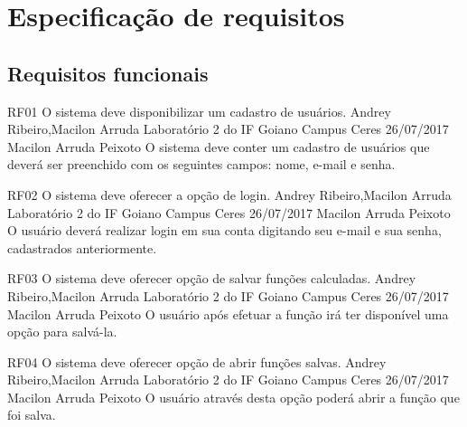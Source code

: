 

\chapter{Especificação de requisitos}
 	
\section{Requisitos funcionais}
 	
 \requisitoFuncional
 {RF01}
 {O sistema deve disponibilizar um cadastro de usuários.}
 {Andrey Ribeiro,Macilon Arruda}
 {Laboratório 2 do IF Goiano Campus Ceres}
 {26/07/2017}
 {Macilon Arruda Peixoto}
 {O sistema deve conter um cadastro de usuários que deverá ser preenchido com os seguintes campos: nome, e-mail e senha.
 }
 
 \requisitoFuncional
 {RF02}
 {O sistema deve oferecer a opção de login.}
 {Andrey Ribeiro,Macilon Arruda}
 {Laboratório 2 do IF Goiano Campus Ceres}
 {26/07/2017}
 {Macilon Arruda Peixoto}
 {O usuário deverá realizar login em sua conta digitando seu e-mail e sua senha, cadastrados anteriormente.
 } 
 
 \requisitoFuncional
 {RF03}
 {O sistema deve oferecer opção de salvar funções calculadas.}
 {Andrey Ribeiro,Macilon Arruda}
 {Laboratório 2 do IF Goiano Campus Ceres}
 {26/07/2017}
 {Macilon Arruda Peixoto}
 {O usuário após efetuar a função irá ter disponível uma opção para salvá-la.
 }
 
 \requisitoFuncional
 {RF04}
 {O sistema deve oferecer opção de abrir funções salvas.}
 {Andrey Ribeiro,Macilon Arruda}
 {Laboratório 2 do IF Goiano Campus Ceres}
 {26/07/2017}
 {Macilon Arruda Peixoto}
 {O usuário através desta opção poderá abrir a função que foi salva. 
 }
 
